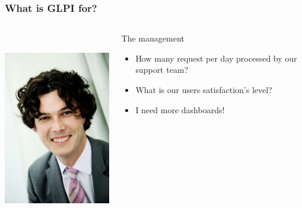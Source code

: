 \documentclass{beamer}
\begin{document}
\begin{frame}
    \frametitle{What is GLPI for?}

 \begin{columns}
 \begin{column}{0.15\textwidth}
         \includegraphics[height=8.5cm]{./pics/manager.jpg}
 \end{column}
 \begin{column}{1.25\textwidth}
    \begin{block}{The management}
        \begin{itemize}
            \item How many request per day processed by our support team?
            \item What is our users satisfaction's level?
            \item I need more dashboards!
        \end{itemize}
    \end{block}
 \end{column}
\end{columns}


\end{frame}
\end{document}

